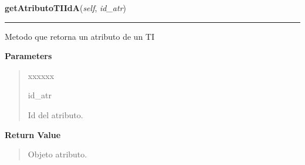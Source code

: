 \hspace{.8\funcindent}\begin{boxedminipage}{\funcwidth}

    \raggedright \textbf{getAtributoTIIdA}(\textit{self}, \textit{id\_atr})

    \vspace{-1.5ex}

    \rule{\textwidth}{0.5\fboxrule}
\setlength{\parskip}{2ex}
    Metodo que retorna un atributo de un TI

\setlength{\parskip}{1ex}
      \textbf{Parameters}
      \vspace{-1ex}

      \begin{quote}
        \begin{Ventry}{xxxxxx}

          \item[id\_atr]

          Id del atributo.

        \end{Ventry}

      \end{quote}

      \textbf{Return Value}
    \vspace{-1ex}

      \begin{quote}
      Objeto atributo.

      \end{quote}

    \end{boxedminipage}

    \label{app:controlador:contArchivo:ControllerAtributoTI:modAtributoTI}

    \vspace{0.5ex}

